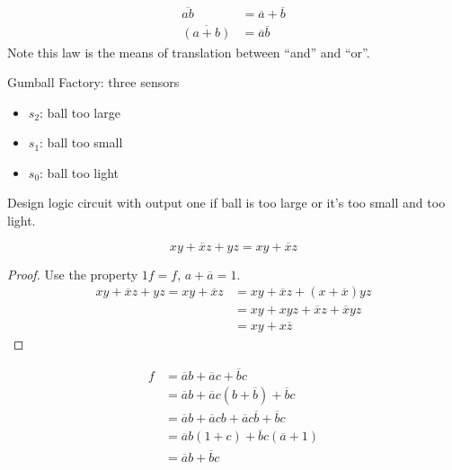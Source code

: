 \documentclass[a4paper, 10pt]{article}
\numberwithin{equation}{section}
\begin{document}
\begin{proposition}
    \begin{align}
        \overline{ab}&=\overline{a} + \overline{b}\\
        \overline{(a+b)}&=\overline{a}\overline{b}
    \end{align}
    Note this law is the means of translation between ``and'' and ``or''.
\end{proposition}
\begin{example}
    Gumball Factory: three sensors \begin{itemize}
        \item $s_2$: ball too large
        \item $s_1$: ball too small
        \item $s_0$: ball too light
    \end{itemize}
    \begin{center}
    \end{center}
    Design logic circuit with output one if ball is too large or it's too small and too light.
\end{example}

\begin{theorem}[Consensus]
    \begin{equation}
        xy+\overline{x}z+yz=xy+\overline{x}z
    \end{equation}
    \begin{proof}
        Use the property $1f=f$, $a+\overline{a}=1$.
        \begin{align}
            xy+\overline{x}z+yz=xy+\overline{x}z&=xy+\overline{x}z+(x+\overline{x})yz\\
            &=xy+xyz+\overline{x}z+\overline{x}yz\\
            &=xy+x\overline{z}
        \end{align}
    \end{proof}
\end{theorem}

\begin{example}
    \begin{align}
        f&=\overline a b+\overline a c+\overline b c\\
        &=\overline ab+\overline ac(b+\overline b)+\overline bc\\
        &=\overline ab+\overline acb+\overline ac\overline b+\overline bc\\
        &=\overline ab(1+c)+\overline bc(\overline a+1)\\
        &=\overline ab+\overline bc
    \end{align}
\end{example}
\end{document}
